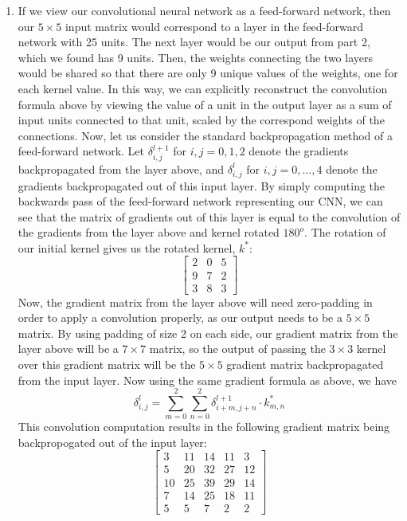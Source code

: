 \documentclass[a4paper]{article}
\begin{document}
\begin{enumerate}
{ }
\item{If we view our convolutional neural network as a feed-forward network, then our $5 \times 5$ input matrix would correspond to a layer in the feed-forward network with 25 units. The next layer would be our output from part 2, which we found has 9 units. Then, the weights connecting the two layers would be shared so that there are only 9 unique values of the weights, one for each kernel value. In this way, we can explicitly reconstruct the convolution formula above by viewing the value of a unit in the output layer as a sum of input units connected to that unit, scaled by the correspond weights of the connections. 
\newline
\newline
Now, let us consider the standard backpropagation method of a feed-forward network. Let $\delta_{i,j}^{l+1}$ for $i,j=0,1,2$ denote the gradients backpropagated from the layer above, and $\delta_{i,j}^{l}$ for $i,j=0,\dots,4$ denote the gradients backpropagated out of this input layer. By simply computing the backwards pass of the feed-forward network representing our CNN, we can see that the matrix of gradients out of this layer is equal to the convolution of the gradients from the layer above and kernel rotated $180^{o}$. The rotation of our initial kernel gives us the rotated kernel, $k^{*}$:
$$
\begin{bmatrix}
2 & 0 & 5 \\
9 & 7 & 2 \\
3 & 8 & 3 
\end{bmatrix}
$$
Now, the gradient matrix from the layer above will need zero-padding in order to apply a convolution properly, as our output needs to be a $5 \times 5$ matrix. By using padding of size 2 on each side, our gradient matrix from the layer above will be a $7 \times 7$ matrix, so the output of passing the $3 \times 3$ kernel over this gradient matrix will be the $5 \times 5$ gradient matrix backpropagated from the input layer.
Now using the same gradient formula as above, we have
$$
\delta_{i,j}^{l}= \sum_{m=0}^2 \sum_{n=0}^2 \delta_{i+m,j+n}^{l+1} \cdot k_{m,n}^{*}
$$
This convolution computation results in the following gradient matrix being backpropogated out of the input layer:
$$
\begin{bmatrix}
3 & 11 & 14 & 11 & 3 \\
5 & 20 & 32 & 27 & 12 \\
10 & 25 & 39 & 29 & 14 \\
7 & 14 & 25 & 18 & 11 \\
5 & 5 & 7 & 2 & 2 
\end{bmatrix}
$$
}
\end{enumerate}
\end{document}
